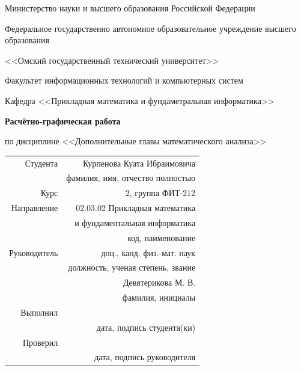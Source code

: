 \documentclass[14pt, a4paper]{article}
\begin{document}
    \thispagestyle{empty}

    \begin{center}
        Министерство науки и высшего образования Российской Федерации

        Федеральное государственно автономное образовательное учреждение высшего образования

        <<Омский государственный технический университет>>

        \vspace{1cm}
        Факультет информационных технологий и компьютерных систем

        Кафедра <<Прикладная математика и фундаметральная информатика>>

        \vspace{3cm}
        \textbf{Расчётно-графическая работа}

        по дисциплине <<Дополнительные главы математического анализа>>
    \end{center}
    
    \vspace{3cm}
    \begin{flushright}    
        \begin{tabular}{ r r }
            Студента & Курпенова Куата Ибраимовича \\
            \cline{2-2}
            & \tiny{фамилия, имя, отчество полностью} \\

            Курс & 2, группа ФИТ-212 \\
            \cline{2-2}
            Направление & 02.03.02 Прикладная математика \\
            \cline{2-2}
            & и фундаментальная информатика \\
            \cline{2-2}
            & \tiny{код, наименование} \\

            Руководитель & доц., канд. физ.-мат. наук \\
            \cline{2-2}
            & \tiny{должность, ученая степень, звание} \\
            & Девятерикова М. В. \\
            \cline{2-2}
            & \tiny{фамилия, инициалы} \\

            Выполнил & \\
            \cline{2-2}
            & \tiny{дата, подпись студента(ки)} \\

            Проверил & \\
            \cline{2-2}
            & \tiny{дата, подпись руководителя} \\

        \end{tabular}
    \end{flushright}
    
\end{document}
